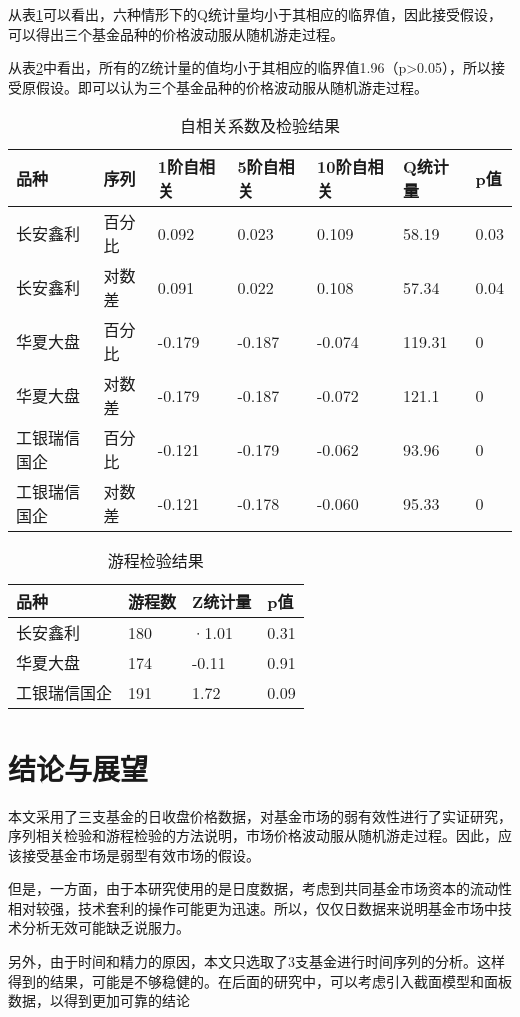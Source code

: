 \documentclass[11pt]{article}
\begin{document}
从表\ref{tb:acf}可以看出，六种情形下的Q统计量均小于其相应的临界值，因此接受假设，可以得出三个基金品种的价格波动服从随机游走过程。

从表\ref{tb:run}中看出，所有的Z统计量的值均小于其相应的临界值1.96（p>0.05），所以接受原假设。即可以认为三个基金品种的价格波动服从随机游走过程。
\begin{table}[h!]
\centering
\caption{自相关系数及检验结果}
\label{tb:acf}
\begin{tabular}{lllllll}\hline\hline
品种&序列&1阶自相关&5阶自相关&10阶自相关&Q统计量&p值\\\hline
长安鑫利&百分比&0.092&0.023&0.109&58.19&0.03\\
长安鑫利&对数差&0.091&0.022&0.108&57.34&0.04\\
华夏大盘&百分比&-0.179&-0.187&-0.074&119.31&0\\
华夏大盘&对数差&-0.179&-0.187&-0.072&121.1&0\\
工银瑞信国企&百分比&-0.121&-0.179&-0.062&93.96&0\\
工银瑞信国企&对数差&-0.121&-0.178&-0.060&95.33&0\\\hline\hline
\end{tabular}
\end{table}


\begin{table}[h!]
\centering
\caption{游程检验结果}
\label{tb:run}
\begin{tabular}{llll}\hline\hline
品种&游程数&Z统计量&p值\\\hline
长安鑫利&180&·1.01&0.31\\
华夏大盘&174&-0.11&0.91\\
工银瑞信国企&191&1.72&0.09\\
\hline\hline
\end{tabular}
\end{table}

\section{结论与展望}
本文采用了三支基金的日收盘价格数据，对基金市场的弱有效性进行了实证研究，序列相关检验和游程检验的方法说明，市场价格波动服从随机游走过程。因此，应该接受基金市场是弱型有效市场的假设。

但是，一方面，由于本研究使用的是日度数据，考虑到共同基金市场资本的流动性相对较强，技术套利的操作可能更为迅速。所以，仅仅日数据来说明基金市场中技术分析无效可能缺乏说服力。

另外，由于时间和精力的原因，本文只选取了3支基金进行时间序列的分析。这样得到的结果，可能是不够稳健的。在后面的研究中，可以考虑引入截面模型和面板数据，以得到更加可靠的结论
\clearpage
\appendix

\end{document}
